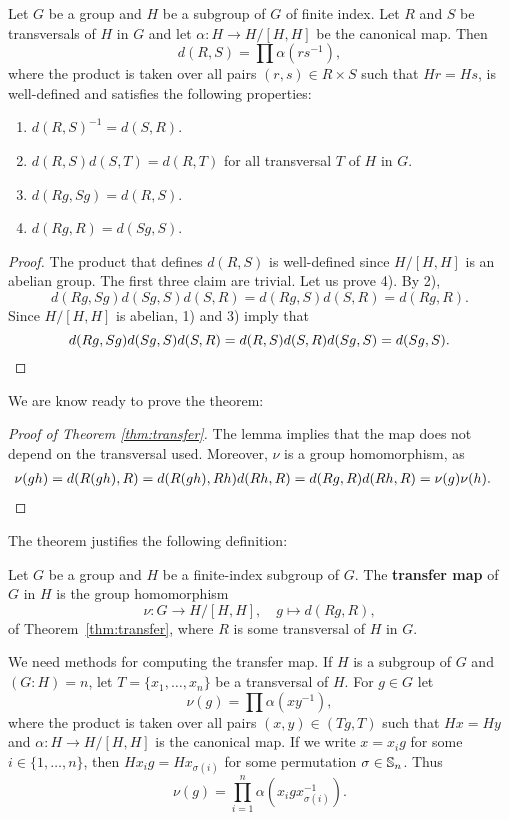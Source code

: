 \begin{lemma}
	\label{lem:d}
	Let $G$ be a group and $H$ be a subgroup of $G$ of finite index.  Let $R$
	and $S$ be transversals of $H$ in $G$ and let $\alpha\colon H\to H/[H,H]$
	be the canonical map. Then 
	\[
		d(R,S)=\prod \alpha(rs^{-1}),
	\]
	where the product is taken over all pairs 
	$(r,s)\in R\times S$ such that $Hr=Hs$,
	is well-defined and satisfies the following properties:
	\begin{enumerate}
		\item $d(R,S)^{-1}=d(S,R)$.
		\item $d(R,S)d(S,T)=d(R,T)$ for all transversal $T$ of $H$ in $G$.
		\item $d(Rg,Sg)=d(R,S)$.
		\item $d(Rg,R)=d(Sg,S)$.
	\end{enumerate}
\end{lemma}

\begin{proof}
	The product that defines $d(R,S)$ is well-defined since $H/[H,H]$ is 
	an abelian group. The first three claim are trivial. Let us prove
	4). By 2), 
	\[
		d(Rg,Sg)d(Sg,S)d(S,R)=d(Rg,S)d(S,R)=d(Rg,R).
	\]
	Since $H/[H,H]$ is abelian, 1) and 3) imply that 	
	\[
		d(Rg,Sg)d(Sg,S)d(S,R)=d(R,S)d(S,R)d(Sg,S)=d(Sg,S).\qedhere
	\]
\end{proof}

We are know ready to prove the theorem: 

\begin{proof}[Proof of Theorem \ref{thm:transfer}]
	The lemma implies that the map does not depend on the transversal used. 
	Moreover, $\nu$ is a group homomorphism, as 
	\begin{align*}
		\nu(gh)&=d(R(gh),R)
		=d(R(gh),Rh)d(Rh,R)
		=d(Rg,R)d(Rh,R)=\nu(g)\nu(h).\qedhere
	\end{align*}
\end{proof}

The theorem justifies the following definition: 

\begin{definition}
	Let $G$ be a group and $H$ be a finite-index subgroup of $G$. The
	\textbf{transfer map} of $G$ in $H$ is the group homomorphism 
	\[
		\nu\colon G\to H/[H,H],
		\quad
		g\mapsto d(Rg,R),
	\]
	of Theorem~\ref{thm:transfer}, where $R$ is some transversal of $H$ in $G$.
\end{definition}

We need methods for computing the transfer map. If $H$ is a subgroup of 
$G$
and $(G:H)=n$, let $T=\{x_1,\dots,x_n\}$ be a transversal of $H$. For $g\in G$ let  
\[
	\nu(g)=\prod \alpha(xy^{-1}),
\]
where the product is taken over all pairs $(x,y)\in (Tg,T)$ such that $Hx=Hy$
and $\alpha\colon H\to H/[H,H]$ is the canonical map. 
If we write 
$x=x_ig$ for some $i\in\{1,\dots,n\}$, then  
$Hx_ig=Hx_{\sigma(i)}$ for some permutation $\sigma\in\mathbb{S}_n$. Thus 
\[
	\nu(g)=\prod_{i=1}^n\alpha(x_igx_{\sigma(i)}^{-1}).
\]

